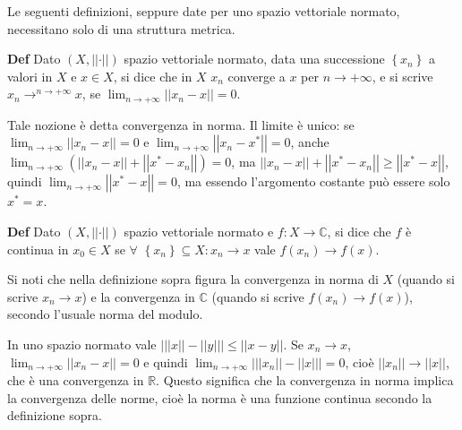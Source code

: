 \documentclass{article}
\begin{document}
Le seguenti definizioni, seppure date per uno spazio vettoriale normato,
necessitano solo di una struttura metrica.

\textbf{Def} Dato $\left( X,\left\vert \left\vert \cdot \right\vert
\right\vert \right) $ spazio vettoriale normato, data una successione $%
\left\{ x_{n}\right\} $ a valori in $X$ e $x\in X$, si dice che in $X$ $%
x_{n} $ converge a $x$ per $n\rightarrow +\infty $, e si scrive $%
x_{n}\rightarrow ^{n\rightarrow +\infty }x$, se $\lim_{n\rightarrow +\infty
}\left\vert \left\vert x_{n}-x\right\vert \right\vert =0$.

Tale nozione \`{e} detta convergenza in norma. Il limite \`{e} unico: se $%
\lim_{n\rightarrow +\infty }\left\vert \left\vert x_{n}-x\right\vert
\right\vert =0$ e $\lim_{n\rightarrow +\infty }\left\vert \left\vert
x_{n}-x^{\ast }\right\vert \right\vert =0$, anche $\lim_{n\rightarrow
+\infty }\left( \left\vert \left\vert x_{n}-x\right\vert \right\vert
+\left\vert \left\vert x^{\ast }-x_{n}\right\vert \right\vert \right) =0$,
ma $\left\vert \left\vert x_{n}-x\right\vert \right\vert +\left\vert
\left\vert x^{\ast }-x_{n}\right\vert \right\vert \geq \left\vert \left\vert
x^{\ast }-x\right\vert \right\vert $, quindi $\lim_{n\rightarrow +\infty
}\left\vert \left\vert x^{\ast }-x\right\vert \right\vert =0$, ma essendo
l'argomento costante pu\`{o} essere solo $x^{\ast }=x$.

\textbf{Def} Dato $\left( X,\left\vert \left\vert \cdot \right\vert
\right\vert \right) $ spazio vettoriale normato e $f:X\rightarrow 
\mathbb{C}
$, si dice che $f$ \`{e} continua in $x_{0}\in X$ se $\forall $ $\left\{
x_{n}\right\} \subseteq X:x_{n}\rightarrow x$ vale $f\left( x_{n}\right)
\rightarrow f\left( x\right) $.

Si noti che nella definizione sopra figura la convergenza in norma di $X$
(quando si scrive $x_{n}\rightarrow x$) e la convergenza in $%
\mathbb{C}
$ (quando si scrive $f\left( x_{n}\right) \rightarrow f\left( x\right) $),
secondo l'usuale norma del modulo.

In uno spazio normato vale $\left\vert \left\vert \left\vert x\right\vert
\right\vert -\left\vert \left\vert y\right\vert \right\vert \right\vert \leq
\left\vert \left\vert x-y\right\vert \right\vert $. Se $x_{n}\rightarrow x$, 
$\lim_{n\rightarrow +\infty }\left\vert \left\vert x_{n}-x\right\vert
\right\vert =0$ e quindi $\lim_{n\rightarrow +\infty }\left\vert \left\vert
\left\vert x_{n}\right\vert \right\vert -\left\vert \left\vert x\right\vert
\right\vert \right\vert =0$, cio\`{e} $\left\vert \left\vert
x_{n}\right\vert \right\vert \rightarrow \left\vert \left\vert x\right\vert
\right\vert $, che \`{e} una convergenza in $%
\mathbb{R}
$. Questo significa che la convergenza in norma implica la convergenza delle
norme, cio\`{e} la norma \`{e} una funzione continua secondo la definizione
sopra.
\end{document}
